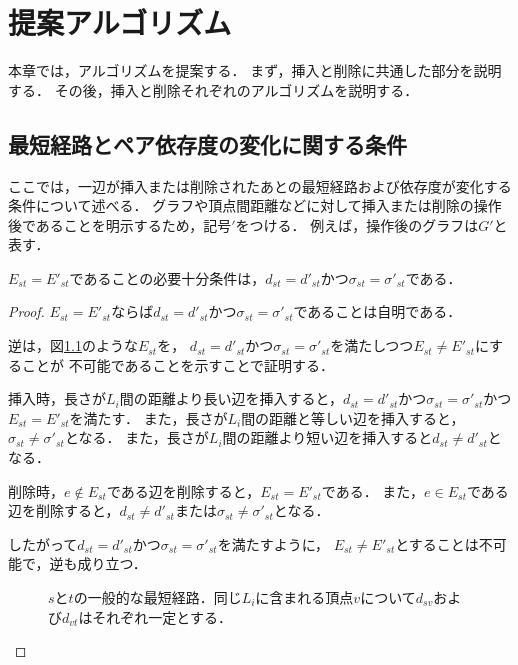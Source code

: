 \chapter{提案アルゴリズム}
\label{chap:algorithm}

本章では，アルゴリズムを提案する．
まず，挿入と削除に共通した部分を説明する．
その後，挿入と削除それぞれのアルゴリズムを説明する．

\section{最短経路とペア依存度の変化に関する条件}
\label{sect:condition-of-variability}

ここでは，一辺が挿入または削除されたあとの最短経路および依存度が変化する条件について述べる．
グラフや頂点間距離などに対して挿入または削除の操作後であることを明示するため，記号$'$をつける．
例えば，操作後のグラフは$G'$と表す．

\begin{lemma}
  \label{lemma:condition-of-invariability-of-shortest-path}
  $E_{st}=E'_{st}$であることの必要十分条件は，$d_{st}=d'_{st}$かつ$\sigma_{st}=\sigma'_{st}$である．
\end{lemma}
\begin{proof}
  $E_{st}=E'_{st}$ならば$d_{st}=d'_{st}$かつ$\sigma_{st}=\sigma'_{st}$であることは自明である．

  逆は，図\ref{fig:proof-invariability-of-paths}のような$E_{st}$を，
  $d_{st}=d'_{st}$かつ$\sigma_{st}=\sigma'_{st}$を満たしつつ$E_{st}\neq E'_{st}$にすることが
  不可能であることを示すことで証明する．

  挿入時，長さが$L_i$間の距離より長い辺を挿入すると，$d_{st}=d'_{st}$かつ$\sigma_{st}=\sigma'_{st}$かつ$E_{st}=E'_{st}$を満たす．
  また，長さが$L_i$間の距離と等しい辺を挿入すると，$\sigma_{st}\neq\sigma'_{st}$となる．
  また，長さが$L_i$間の距離より短い辺を挿入すると$d_{st}\neq d'_{st}$となる．

  削除時，$e\notin E_{st}$である辺を削除すると，$E_{st}=E'_{st}$である．
  また，$e\in E_{st}$である辺を削除すると，$d_{st}\neq d'_{st}$または$\sigma_{st}\neq\sigma'_{st}$となる．

  したがって$d_{st}=d'_{st}$かつ$\sigma_{st}=\sigma'_{st}$を満たすように，
  $E_{st}\neq E'_{st}$とすることは不可能で，逆も成り立つ．

  \begin{figure}
    \centering
    \def\svgwidth{.5\columnwidth}
    
    \caption{$s$と$t$の一般的な最短経路．同じ$L_i$に含まれる頂点$v$について$d_{sv}$および$d_{vt}$はそれぞれ一定とする．}
    \label{fig:proof-invariability-of-paths}
  \end{figure}
\end{proof}

